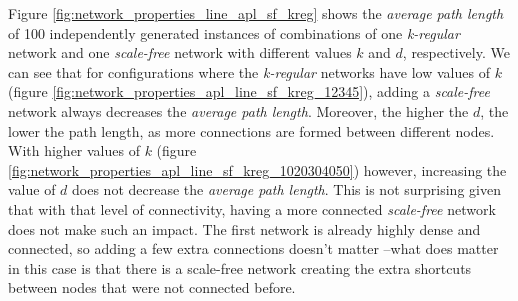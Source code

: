 \documentclass[preprint,number]{elsarticle}
\begin{document}
Figure \ref{fig:network_properties_line_apl_sf_kreg} shows the \textit{average path length} of 100 independently generated instances of combinations of one \textit{k-regular} network and one \textit{scale-free} network with different values $k$ and $d$, respectively. We can see that for configurations where the \textit{k-regular} networks have low values of $k$ (figure \ref{fig:network_properties_apl_line_sf_kreg_12345}), adding a \textit{scale-free} network always decreases the \textit{average path length}. Moreover, the higher the $d$, the lower the path length, as more connections are formed between different nodes. With higher values of $k$ (figure \ref{fig:network_properties_apl_line_sf_kreg_1020304050}) however, increasing the value of $d$ does not decrease the \textit{average path length}. This is not surprising given that with that level of connectivity, having a more connected \textit{scale-free} network does not make such an impact. The first network is already highly dense and connected, so adding a few extra connections doesn't matter --what does matter in this case is that there is a scale-free network creating the extra shortcuts between nodes that were not connected before.
\end{document}
